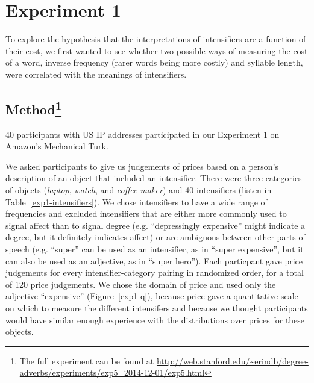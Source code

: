 \documentclass[10pt,letterpaper]{article}
\begin{document}
\section{Experiment 1}

To explore the hypothesis that the interpretations of intensifiers are a function of their cost, we first wanted to see whether two possible ways of measuring the cost of a word, inverse frequency (rarer words being more costly) and syllable length, were correlated with the meanings of intensifiers.

\subsection{Method\footnote{The full experiment can be found at \url{http://web.stanford.edu/~erindb/degree-adverbs/experiments/exp5_2014-12-01/exp5.html}}}

40 participants with US IP addresses participated in our Experiment 1 on Amazon's Mechanical Turk.

We asked participants to give us judgements of prices based on a person's description of an object that included an intensifier. There were three categories of objects (\emph{laptop}, \emph{watch}, and \emph{coffee maker}) and 40 intensifiers (listen in Table~\ref{exp1-intensifiers}). We chose intensifiers to have a wide range of frequencies and excluded intensifiers that are either more commonly used to signal affect than to signal degree (e.g. ``depressingly expensive'' might indicate a degree, but it definitely indicates affect) or are ambiguous between other parts of speech (e.g. ``super'' can be used as an intensifier, as in ``super expensive'', but it can also be used as an adjective, as in ``super hero''). Each particpant gave price judgements for every intensifier-category pairing in randomized order, for a total of 120 price judgements. We chose the domain of price and used only the adjective ``expensive'' (Figure~\ref{exp1-q}), because price gave a quantitative scale on which to measure the different intensifers and because we thought participants would have similar enough experience with the distributions over prices for these objects.
\end{document}
